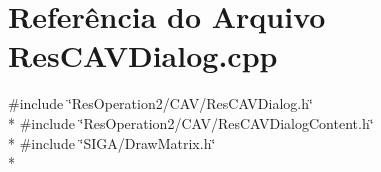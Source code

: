 \section{Referência do Arquivo Res\+C\+A\+V\+Dialog.\+cpp}
\label{_2_c_a_v_2_res_c_a_v_dialog_8cpp}
{\ttfamily \#include \char`\"{}Res\+Operation2/\+C\+A\+V/\+Res\+C\+A\+V\+Dialog.\+h\char`\"{}}\\*
{\ttfamily \#include \char`\"{}Res\+Operation2/\+C\+A\+V/\+Res\+C\+A\+V\+Dialog\+Content.\+h\char`\"{}}\\*
{\ttfamily \#include \char`\"{}S\+I\+G\+A/\+Draw\+Matrix.\+h\char`\"{}}\\*
